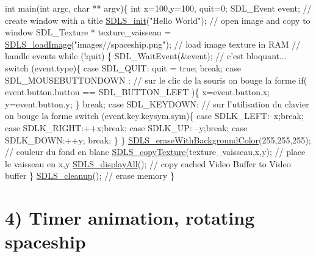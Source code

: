 \begin{DoxyCode}
\textcolor{keywordtype}{int} main(\textcolor{keywordtype}{int} argc, \textcolor{keywordtype}{char} ** argv)\{
 \textcolor{keywordtype}{int} x=100,y=100, quit=0;
 SDL\_Event event;
\textcolor{comment}{// create window with a title}
 \hyperlink{_s_d_l_s_8c_a75205531dbfd4d3a3166e245227b9c12}{SDLS\_init}(\textcolor{stringliteral}{"Hello World"});
\textcolor{comment}{// open image and copy to window}
 SDL\_Texture * texture\_vaisseau = \hyperlink{_s_d_l_s_8c_ad6c27fd6e5502847ca73fb30f990cf0a}{SDLS\_loadImage}(\textcolor{stringliteral}{"images//spaceship.png"}); \textcolor{comment}{// load image
       texture in RAM}
\textcolor{comment}{// handle events}
 \textcolor{keywordflow}{while} (!quit)
 \{
    SDL\_WaitEvent(&event); \textcolor{comment}{// c'est bloquant...}
    \textcolor{keywordflow}{switch} (event.type)\{
      \textcolor{keywordflow}{case} SDL\_QUIT:
        quit = \textcolor{keyword}{true};
        \textcolor{keywordflow}{break};
      \textcolor{keywordflow}{case} SDL\_MOUSEBUTTONDOWN : \textcolor{comment}{// sur le clic de la souris on bouge la forme}
         \textcolor{keywordflow}{if}( event.button.button == SDL\_BUTTON\_LEFT )\{
            x=\textcolor{keyword}{event}.button.x;
            y=\textcolor{keyword}{event}.button.y;
         \}
         \textcolor{keywordflow}{break};
      \textcolor{keywordflow}{case} SDL\_KEYDOWN:       \textcolor{comment}{// sur l'utilisation du clavier on bouge la forme}
         \textcolor{keywordflow}{switch} (event.key.keysym.sym)\{
           \textcolor{keywordflow}{case} SDLK\_LEFT:--x;\textcolor{keywordflow}{break};
           \textcolor{keywordflow}{case} SDLK\_RIGHT:++x;\textcolor{keywordflow}{break};
           \textcolor{keywordflow}{case} SDLK\_UP: --y;\textcolor{keywordflow}{break};
           \textcolor{keywordflow}{case} SDLK\_DOWN:++y; \textcolor{keywordflow}{break};
        \}
    \}
     \hyperlink{_s_d_l_s_8c_aa0cca2ad329a916f149af068671bac0c}{SDLS\_eraseWithBackgroundColor}(255,255,255); \textcolor{comment}{// couleur du fond en blanc}
    \hyperlink{_s_d_l_s_8c_a8a47ba62fed8a205c80cc93f521cb2e2}{SDLS\_copyTexture}(texture\_vaisseau,x,y);     \textcolor{comment}{// place le vaisseau en x,y}
    \hyperlink{_s_d_l_s_8c_a139692381ca40eb058ee477b4f561189}{SDLS\_displayAll}(); \textcolor{comment}{// copy cached Video Buffer to Video buffer}
 \}
 \hyperlink{_s_d_l_s_8c_aacc824d008ac615b82cc715c567ff91a}{SDLS\_cleanup}();  \textcolor{comment}{// erase memory}
\}
\end{DoxyCode}
\hypertarget{index_third}{}\section{4) Timer animation, rotating spaceship}\label{index_third}
